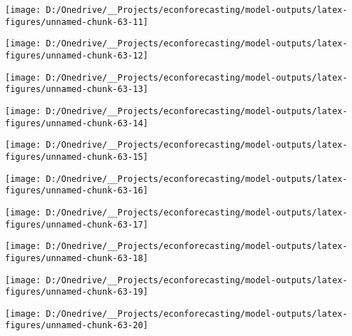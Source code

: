 \documentclass[11pt, letterpaper]{article}\usepackage[]{graphicx}\usepackage[]{color}
\begin{document}
{\centering \texttt{[image: D:/Onedrive/\_\_Projects/econforecasting/model-outputs/latex-figures/unnamed-chunk-63-11]} 

}




{\centering \texttt{[image: D:/Onedrive/\_\_Projects/econforecasting/model-outputs/latex-figures/unnamed-chunk-63-12]} 

}




{\centering \texttt{[image: D:/Onedrive/\_\_Projects/econforecasting/model-outputs/latex-figures/unnamed-chunk-63-13]} 

}




{\centering \texttt{[image: D:/Onedrive/\_\_Projects/econforecasting/model-outputs/latex-figures/unnamed-chunk-63-14]} 

}




{\centering \texttt{[image: D:/Onedrive/\_\_Projects/econforecasting/model-outputs/latex-figures/unnamed-chunk-63-15]} 

}




{\centering \texttt{[image: D:/Onedrive/\_\_Projects/econforecasting/model-outputs/latex-figures/unnamed-chunk-63-16]} 

}




{\centering \texttt{[image: D:/Onedrive/\_\_Projects/econforecasting/model-outputs/latex-figures/unnamed-chunk-63-17]} 

}




{\centering \texttt{[image: D:/Onedrive/\_\_Projects/econforecasting/model-outputs/latex-figures/unnamed-chunk-63-18]} 

}




{\centering \texttt{[image: D:/Onedrive/\_\_Projects/econforecasting/model-outputs/latex-figures/unnamed-chunk-63-19]} 

}




{\centering \texttt{[image: D:/Onedrive/\_\_Projects/econforecasting/model-outputs/latex-figures/unnamed-chunk-63-20]} 

}
\end{document}
